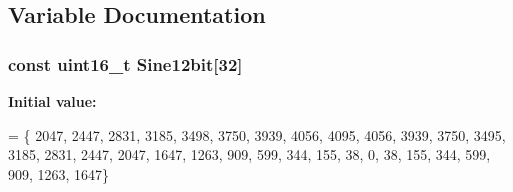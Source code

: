 \subsection{Variable Documentation}
\hypertarget{group___d_a_c___signals_generation_gae94448e8040f05b58426b96bc089adb7}{
\subsubsection[{Sine12bit}]{\setlength{\rightskip}{0pt plus 5cm}const uint16\-\_\-t Sine12bit\mbox{[}32\mbox{]}}}\label{group___d_a_c___signals_generation_gae94448e8040f05b58426b96bc089adb7}
{\bfseries Initial value\-:}
\begin{DoxyCode}
= \{
                      2047, 2447, 2831, 3185, 3498, 3750, 3939, 4056, 4095, 4056,
                      3939, 3750, 3495, 3185, 2831, 2447, 2047, 1647, 1263, 909, 
                      599, 344, 155, 38, 0, 38, 155, 344, 599, 909, 1263, 1647\}
\end{DoxyCode}
